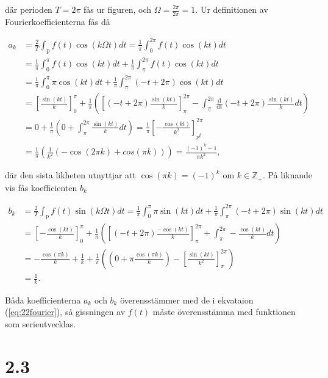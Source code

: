 \documentclass[a4paper]{article}
\begin{document}
\noindent där perioden $T = 2\pi$ fås ur figuren, och $\Omega =
\frac{2\pi}{2\pi} = 1$. Ur definitionen av Fourierkoefficienterna fås då

\setlength{\jot}{10pt}
\begin{align*}
  a_k &= \frac{2}{T}\int_{\text{p}}f(t)\cos(k\Omega t) dt = \frac{1}{\pi}\int_0^{2\pi}f(t)\cos(kt)dt\\
      &= \frac{1}{\pi}\int_0^{\pi}f(t)\cos(kt)dt + \frac{1}{\pi}\int_{\pi}^{2\pi}f(t)\cos(kt)dt\\
      &= \frac{1}{\pi}\int_0^{\pi}\pi\cos(kt)dt + \frac{1}{\pi}\int_{\pi}^{2\pi}(-t + 2\pi)\cos(kt)dt\\
      & = \left[ \frac{\sin(kt)}{k} \right]_0^{\pi} + \frac{1}{\pi}\left( \left[ (-t + 2\pi)\frac{\sin(kt)}{k} \right]_{\pi}^{2\pi} - \int_{\pi}^{2\pi}\frac{\text{d}}{\text{dt}}(-t + 2\pi)\frac{\sin(kt)}{k}dt \right)\\
      &= 0 + \frac{1}{\pi}\left( 0 + \int_{\pi}^{2\pi}\frac{\sin(kt)}{k}dt \right) = \frac{1}{\pi}\left[ -\frac{\cos(kt)}{k^2} \right]_{_pi}^{2\pi}\\
  &= \frac{1}{\pi}\left( \frac{1}{k^2}(-\cos(2\pi k) + cos(\pi k)) \right) = \frac{(-1)^k - 1}{\pi k^2},
\end{align*}

\noindent där den sista likheten utnyttjar att $\cos(\pi k) = (-1)^k$ om $k \in
\mathbb{Z}_+$. På liknande vis fås koefficienten $b_k$

\begin{align*}
  b_k &= \frac{2}{T}\int_{\text{p}}f(t)\sin(k\Omega t)dt = \frac{1}{\pi}\int_0^{\pi}\pi\sin(kt)dt + \frac{1}{\pi}\int_{\pi}^{2\pi}(-t + 2\pi)\sin(kt)dt\\
      &= \left[ -\frac{\cos(kt)}{k} \right]_0^{\pi} + \frac{1}{\pi}\left( \left[ (-t+2\pi)\frac{-\cos(kt)}{k} \right]_{\pi}^{2\pi} + \int_{\pi}^{2\pi}-\frac{\cos(kt)}{k}dt \right)\\
      &= -\frac{\cos(\pi k)}{k} + \frac{1}{k} + \frac{1}{\pi}\left( \left( 0 + \pi\frac{\cos(\pi k)}{k} \right) - \left[ \frac{\sin(kt)}{k^2} \right]_{\pi}^{2\pi} \right)\\
  &= \frac{1}{k}.
\end{align*}

Båda koefficienterna $a_k$ och $b_k$ överensstämmer med de i ekvataion
(\ref{eq:22fourier}), så gissningen av $f(t)$ måste överensstämma med funktionen
som serieutvecklas.

\section*{2.3}
\end{document}
